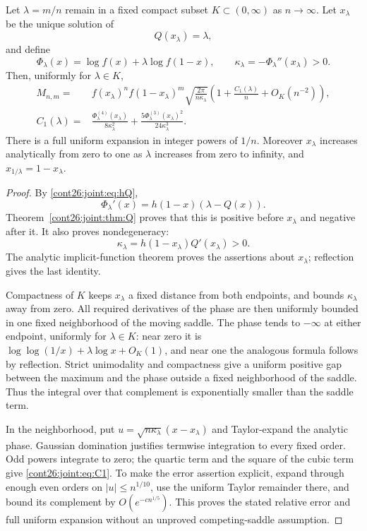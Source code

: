 \begin{theorem}
\label{cont26:joint:thm:laplace}
Let $\lambda=m/n$ remain in a fixed compact subset $K\subset(0,\infty)$
as $n\to\infty$.  Let $x_\lambda$ be the unique solution of
\begin{equation}\label{cont26:joint:eq:saddle}
 Q(x_\lambda)=\lambda,
\end{equation}
and define
\[
 \Phi_\lambda(x)=\log f(x)+\lambda\log f(1-x),\qquad
 \kappa_\lambda=-\Phi_\lambda''(x_\lambda)>0.
\]
Then, uniformly for $\lambda\in K$,
\begin{align}\label{cont26:joint:eq:laplace}
 M_{n,m}={}&f(x_\lambda)^n f(1-x_\lambda)^m
 \sqrt{\frac{2\pi}{n\kappa_\lambda}}
 \left(1+\frac{C_1(\lambda)}n+O_K(n^{-2})\right),\\
 C_1(\lambda)={}&
 \frac{\Phi_\lambda^{(4)}(x_\lambda)}{8\kappa_\lambda^2}
 +\frac{5\Phi_\lambda^{(3)}(x_\lambda)^2}{24\kappa_\lambda^3}.
 \label{cont26:joint:eq:C1}
\end{align}
There is a full uniform expansion in integer powers of $1/n$.
Moreover $x_\lambda$ increases analytically from zero to one as
$\lambda$ increases from zero to infinity, and
$x_{1/\lambda}=1-x_\lambda$.
\end{theorem}

\begin{proof}
By \eqref{cont26:joint:eq:hQ},
\[
 \Phi_\lambda'(x)=h(1-x)(\lambda-Q(x)).
\]
Theorem~\ref{cont26:joint:thm:Q} proves that this is positive before
$x_\lambda$ and negative after it.  It also proves nondegeneracy:
\begin{equation}\label{cont26:joint:eq:curvature}
 \kappa_\lambda=h(1-x_\lambda)Q'(x_\lambda)>0.
\end{equation}
The analytic implicit-function theorem proves the assertions about
$x_\lambda$; reflection gives the last identity.

Compactness of $K$ keeps $x_\lambda$ a fixed distance from both
endpoints, and bounds $\kappa_\lambda$ away from zero.  All required
derivatives of the phase are then uniformly bounded in one fixed
neighborhood of the moving saddle.  The phase tends to $-\infty$
at either endpoint, uniformly for $\lambda\in K$: near zero it is
$\log\log(1/x)+\lambda\log x+O_K(1)$, and near one the analogous
formula follows by reflection.  Strict unimodality and compactness
give a uniform positive gap between the maximum and the phase
outside a fixed neighborhood of the saddle.  Thus the integral over
that complement is exponentially smaller than the saddle term.

In the neighborhood, put $u=\sqrt{n\kappa_\lambda}(x-x_\lambda)$
and Taylor-expand the analytic phase.  Gaussian domination justifies
termwise integration to every fixed order.  Odd powers integrate to
zero; the quartic term and the square of the cubic term give
\eqref{cont26:joint:eq:C1}.  To make the error assertion explicit, expand
through enough even orders on $|u|\le n^{1/10}$, use the uniform
Taylor remainder there, and bound its complement by
$O(e^{-c n^{1/5}})$.  This proves the stated relative error and full
uniform expansion without an unproved competing-saddle assumption.
\end{proof}

